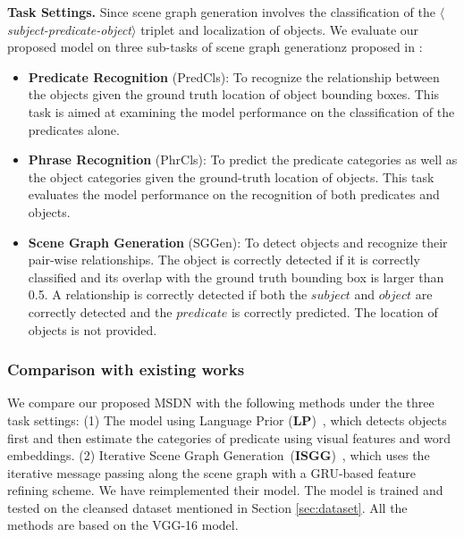 \textbf{Task Settings.} Since scene graph generation involves the classification of the $\langle$\emph{subject-predicate-object}$\rangle$  triplet and localization of objects. We evaluate our proposed model on three sub-tasks of scene graph generationz proposed in \cite{xu2017scene}:
\begin{itemize}
	\item \textbf{Predicate Recognition} (PredCls): To recognize the relationship between the objects given the ground truth location of object bounding boxes. This task is aimed at examining the model performance on the classification of the predicates alone.

	\item \textbf{Phrase Recognition} (PhrCls): To predict the predicate categories as well as the object categories given the ground-truth location of objects. This task evaluates the model performance on the recognition of both predicates and objects.

	\item \textbf{Scene Graph Generation} (SGGen): To detect objects and recognize their pair-wise relationships. The object is correctly detected if it is correctly classified and its overlap with the ground truth bounding box is larger than 0.5. A relationship is correctly detected if both the $subject$ and $object$ are correctly detected and the $predicate$ is correctly predicted. The location of objects is not provided.
\end{itemize} 




\subsubsection{Comparison with existing works}

We compare our proposed MSDN with the following methods under the three task settings:  (1) The model using Language Prior (\textbf{LP})~\cite{visual_relationship}, which detects objects first and then estimate the categories of predicate using visual features and word embeddings. (2) Iterative Scene Graph Generation~(\textbf{ISGG})~\cite{xu2017scene}, which uses the iterative message passing along the scene graph with a GRU-based feature refining scheme. We have reimplemented their model. The model is trained and tested on the cleansed dataset mentioned in Section \ref{sec:dataset}.  All the methods are based on the VGG-16 model.

